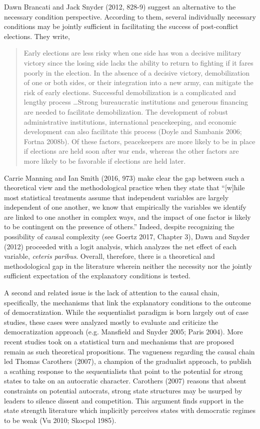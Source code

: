 \documentclass [11pt]{article}
\begin{document}
Dawn Brancati and Jack Snyder (2012, 828-9) suggest an alternative to the necessary condition perspective. According to them, several individually necessary conditions may be jointly sufficient in facilitating the success of post-conflict elections. They write,

\begin{quote}
\small
Early elections are less risky when one side has won a decisive military victory since the losing side lacks the ability to return to fighting if it fares poorly in the election. In the absence of a decisive victory, demobilization of one or both sides, or their integration into a new army, can mitigate the risk of early elections. Successful demobilization is a complicated and lengthy process \dots Strong bureaucratic institutions and generous financing are needed to facilitate demobilization. The development of robust administrative institutions, international peacekeeping, and economic development can also facilitate this process (Doyle and Sambanis 2006; Fortna 2008b). Of these factors, peacekeepers are more likely to be in place if elections are held soon after war ends, whereas the other factors are more likely to be favorable if elections are held later.
\end{quote}

Carrie Manning and Ian Smith (2016, 973) make clear the gap between such a theoretical view and the methodological practice when they state that ``[w]hile most statistical treatments assume that independent variables are largely independent of one another, we know that empirically the variables we identify are linked to one another in complex ways, and the impact of one factor is likely to be contingent on the presence of others.'' Indeed, despite recognizing the possibility of causal complexity (see Goertz 2017, Chapter 3), Dawn and Snyder (2012) proceeded with a logit analysis, which analyzes the net effect of each variable, \emph{ceteris paribus}. Overall, therefore, there is a theoretical and methodological gap in the literature wherein neither the necessity nor the jointly sufficient expectation of the explanatory conditions is tested.

A second and related issue is the lack of attention to the causal chain, specifically, the mechanisms that link the explanatory conditions to the outcome of democratization. While the sequentialist paradigm is born largely out of case studies, these cases were analyzed mostly to evaluate and criticize the democratization approach (e.g. Mansfield and Snyder 2005; Paris 2004). More recent studies took on a statistical turn and mechanisms that are proposed remain as such theoretical propositions. The vagueness regarding the causal chain led Thomas Carothers (2007), a champion of the gradualist approach, to publish a scathing response to the sequentialists that point to the potential for strong states to take on an autocratic character. Carothers (2007) reasons that absent constraints on potential autocrats, strong state structures may be usurped by leaders to silence dissent and competition. This argument finds support in the state strength literature which implicitly perceives states with democratic regimes to be weak (Vu 2010; Skocpol 1985).
\end{document}
